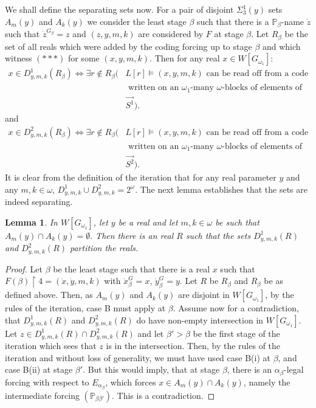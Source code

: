 \documentclass[a4paper,11pt]{article}
\newtheorem{lemma}[theorem]{Lemma}
\newcommand{\forceP}{\mathbb{P}}
\begin{document}
We shall define the separating sets now.
For a pair of disjoint $\Sigma^1_3(y)$ sets $A_m(y)$ and $A_k(y)$
we consider the least stage $\beta$ such that there is a $\forceP_{\beta}$-name $\dot{z}$ such that $\dot{z}^{G_{\beta}}=z$ and $(z,y,m,k)$ are considered by $F$ at stage $\beta$. Let $R_{\beta}$ be the set of all reals  which were added by the coding forcing up to stage $\beta$ and which witness $({\ast}{\ast}{\ast})$ for some $(x,y,m,k)$.
Then for any real $x \in W[G_{\omega_1}]$:
\begin{align*}
x \in D^1_{y,m,k} (R_{\beta})\Leftrightarrow \exists r \notin R_{\beta} (&L[r]  \models (x,y,m,k) \text{ can be read off from a code} \\& \text{ written on an } \omega_1\text{-many $\omega$-blocks of elements of } \\& \vec{S^1} ).
\end{align*}
and
\begin{align*}
x \in D^2_{y,m,k} (R_{\beta})\Leftrightarrow \exists r \notin R_{\beta} (&L[r]  \models (x,y,m,k) \text{ can be read off from a code} \\& \text{ written on an } \omega_1\text{-many $\omega$-blocks of elements of } \\& \vec{S^2}).
\end{align*}
It is clear from the definition of the iteration that for any  real parameter $y$ and any $m,k \in \omega$, $D^1_{y,m,k} \cup D^2_{y,m,k} = 2^{\omega}$. 
The next lemma establishes that the sets are indeed separating.
\begin{lemma}
In $W[G_{\omega_1}]$, let $y$ be a real and let $m,k \in \omega$ be such that $A_m(y) \cap A_k(y)=\emptyset.$ Then there is an real $R$ such that the sets  $D^1_{y,m,k}(R)$ and $ D^2_{y,m,k}(R)$ partition the reals. 
\end{lemma}
\begin{proof}
Let $\beta$ be the least stage such that there is a real $x$ such that $F(\beta) \upharpoonright 4=(\dot{x}, \dot{y},m,k)$ with $\dot{x}^G_{\beta}=x$, $\dot{y}^G_{\beta}=y$. Let $R$ be $R_{\beta}$ and $R_{\beta}$ be as defined above. Then, as $A_m(y)$ and $A_k(y)$ are disjoint in $W[G_{\omega_1}]$, by the rules of the iteration, case B must apply at $\beta$. Assume now for a contradiction, that $D^1_{y,m,k}(R)$ and $ D^2_{y,m,k}(R)$ do have non-empty intersection in $W[G_{\omega_1}]$. Let $z \in D^1_{y,m,k}(R) \cap D^2_{y,m,k}(R)$ and let $\beta' > \beta$ be the first stage of the iteration which sees that $z$ is in the intersection. Then, by the rules of the iteration and without loss of generality, we must have used case B(i) at $\beta$, and case B(ii) at stage $\beta'$. But this would imply, that at stage $\beta$, there is an $\alpha_{\beta}$-legal forcing with respect to $E_{\alpha_{\beta}}$, which forces $x \in A_m(y) \cap A_k(y)$, namely the intermediate forcing $(\forceP_{\beta \beta'} )$. This is a contradiction.

\end{proof}
\end{document}
